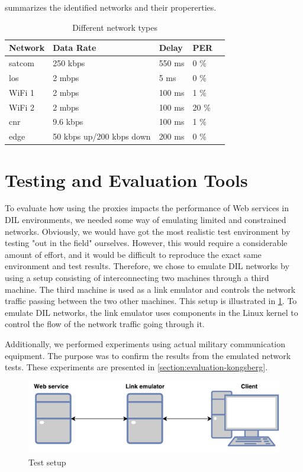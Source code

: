  summarizes the identified networks and their
propererties.

\begin{table}[h]
\begin{tabular}{| l | l | l | l | l |}
\hline
  \textbf{Network} & \textbf{Data Rate} & \textbf{Delay} & \textbf{PER} \\ \hline
  \gls{satcom} & 250 kbps & 550 ms & 0 \% \\ \hline
  \gls{los} & 2 mbps & 5 ms & 0 \% \\ \hline
  WiFi 1 & 2 mbps & 100 ms & 1 \% \\ \hline
  WiFi 2 & 2 mbps & 100 ms & 20 \% \\ \hline
  \gls{cnr} & 9.6 kbps & 100 ms & 1 \% \\ \hline
  \gls{edge} & 50 kbps up/200 kbps down & 200 ms & 0 \% \\ \hline
\end{tabular}
\caption{Different network types}
\label{table-network-types}
\end{table}


\section{Testing and Evaluation Tools}

To evaluate how using the proxies impacts the performance of Web services in DIL
environments, we needed some way of emulating limited and constrained networks.
Obviously, we would have got the most realistic test environment by testing "out
in the field" ourselves. However, this would require a considerable amount of
effort, and it would be difficult to reproduce the exact same environment and
test results. Therefore, we chose to emulate DIL networks by using a setup
consisting of interconnecting two machines through a third machine. The third
machine is used as a link emulator and controls the network traffic passing
between the two other machines. This setup is illustrated in
\cref{figure-testing-environment-simple}. To emulate DIL networks, the link
emulator uses components in the Linux kernel to control the flow of the network
traffic going through it.

Additionally, we performed experiments using actual military communication
equipment. The purpose was to confirm the results from the emulated network
tests. These experiments are presented in \cref{section:evaluation-kongsberg}.

\begin{figure}[h]
\includegraphics[scale=0.73]{images/testing_environment_simple.pdf}
\caption{Test setup}
\label{figure-testing-environment-simple}
\end{figure}


